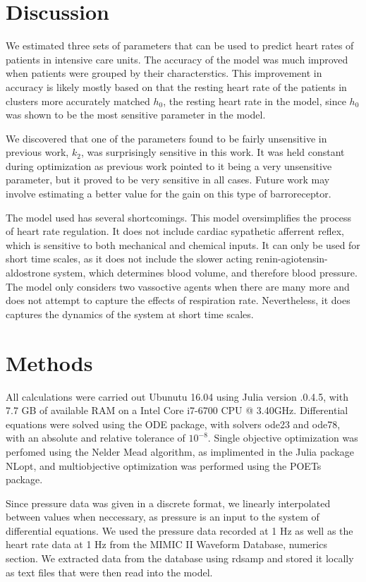 \documentclass[fleqn,10pt]{wlscirep}
\begin{document}
\section*{Discussion}
We estimated three sets of parameters that can be used to predict heart rates of patients in intensive care units. The accuracy of the model was much improved when patients were grouped by their characterstics. This improvement in accuracy is likely mostly based on that the resting heart rate of the patients in clusters more accurately matched $h_0$, the resting heart rate in the model, since $h_0$ was shown to be the most sensitive parameter in the model. 

We discovered that one of the parameters found to be fairly unsensitive in previous work, $k_2$, was surprisingly sensitive in this work. It was held constant during optimization as previous work pointed to it being a very unsensitive parameter, but it proved to be very sensitive in all cases. Future work may involve estimating a better value for the gain on this type of barroreceptor. 

The model used has several shortcomings. This model oversimplifies the process of heart rate regulation. It does not include cardiac sypathetic afferrent reflex, which is sensitive to both mechanical and chemical inputs. \cite{du2007love} It can only be used for short time scales, as it does not include the slower acting renin-agiotensin-aldostrone system, which determines blood volume, and therefore blood pressure. \cite{boron2016medical} The model only considers two vassoctive agents when there are many more and does not attempt to capture the effects of respiration rate.  Nevertheless, it does captures the dynamics of the system at short time scales.
\section*{Methods}
All calculations were carried out Ubunutu 16.04 using Julia version .0.4.5, with 7.7 GB of available RAM on a Intel Core i7-6700 CPU @ 3.40GHz. Differential equations were solved using the ODE package, with solvers ode23 and ode78, with an absolute and relative tolerance of $10^{-8}$. Single objective optimization was perfomed using the Nelder Mead algorithm, as implimented in the Julia package NLopt, and multiobjective optimization was performed using the POETs package. 

Since pressure data was given in a discrete format, we linearly interpolated between values when neccessary, as pressure is an input to the system of differential equations. We used the pressure data recorded at 1 Hz as well as the heart rate data at 1 Hz from the MIMIC II Waveform Database, numerics section. We extracted data from the database using rdsamp and stored it locally as text files that were then read into the model.

\end{document}
